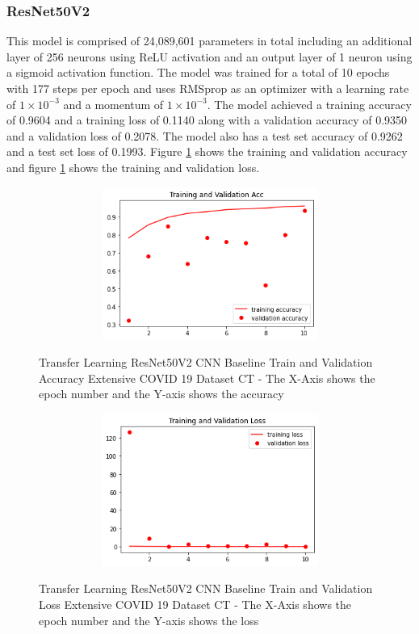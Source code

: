 \subsubsection{ResNet50V2}
This model is comprised of 24,089,601 parameters in total including an additional layer of 256 neurons using ReLU activation and an output layer of 1 neuron using a sigmoid activation function.  The model was trained for a total of 10 epochs with 177 steps per epoch and uses RMSprop as an optimizer with a learning rate of $1\times10^{-3}$ and a momentum of $1\times10^{-3}$.  The model achieved a training accuracy of 0.9604 and a training loss of 0.1140 along with a validation accuracy of 0.9350 and a validation loss of 0.2078.  The model also has a test set accuracy of 0.9262 and a test set loss of 0.1993. Figure \ref{fig:ResNet50V2 CNN Baseline Train and Validation Accuracy Extensive COVID 19 Dataset CT} shows the training and validation accuracy and figure \ref{fig:ResNet50V2 CNN Baseline Train and Validation Accuracy Extensive COVID 19 Dataset CT} shows the training and validation loss.
 \begin{figure}[H]
    \centering
    \includegraphics[width=1\textwidth,height=5cm,keepaspectratio]{Images/ResNet50V2BaselineTrainingValidationAccuracyExtensiveCT.png}\\
    \caption{Transfer Learning ResNet50V2 CNN Baseline Train and Validation Accuracy Extensive COVID 19 Dataset CT - The X-Axis shows the epoch number and the Y-axis shows the accuracy}
    \label{fig:ResNet50V2 CNN Baseline Train and Validation Accuracy Extensive COVID 19 Dataset CT}
\end{figure}
 \begin{figure}[H]
    \centering   \includegraphics[width=1\textwidth,height=5cm,keepaspectratio]{Images/ResNet50V2BaselineTrainingValidationLossExtensiveCT.png}\\
    \caption{Transfer Learning ResNet50V2 CNN Baseline Train and Validation Loss Extensive COVID 19 Dataset CT - The X-Axis shows the epoch number and the Y-axis shows the loss}
    \label{fig:ResNet50V2 CNN Baseline Train and Validation Loss Extensive COVID 19 Dataset CT}
\end{figure}
